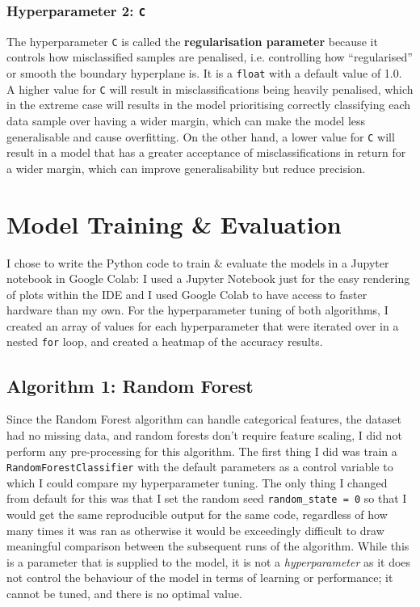 \documentclass[a4paper, 10pt]{article}
\begin{document}
\subsubsection{Hyperparameter 2: \texttt{C}}
The hyperparameter \texttt{C} is called the \textbf{regularisation parameter} because it controls how misclassified samples are penalised, i.e. controlling how ``regularised'' or smooth the boundary hyperplane is.
It is a \texttt{float} with a default value of 1.0.
A higher value for \texttt{C} will result in misclassifications being heavily penalised, which in the extreme case will results in the model prioritising correctly classifying each data sample over having a wider margin, which can make the model less generalisable and cause overfitting.
On the other hand, a lower value for \texttt{C} will result in a model that has a greater acceptance of misclassifications in return for a wider margin, which can improve generalisability but reduce precision.

\section{Model Training \& Evaluation}
I chose to write the Python code to train \& evaluate the models in a Jupyter notebook in Google Colab: I used a Jupyter Notebook just for the easy rendering of plots within the IDE and I used Google Colab to have access to faster hardware than my own.
For the hyperparameter tuning of both algorithms, I created an array of values for each hyperparameter that were iterated over in a nested \texttt{for} loop, and created a heatmap of the accuracy results.

\subsection{Algorithm 1: Random Forest}\label{sec:foresteval}
Since the Random Forest algorithm can handle categorical features, the dataset had no missing data, and random forests don't require feature scaling, I did not perform any pre-processing for this algorithm.
The first thing I did was train a \texttt{RandomForestClassifier} with the default parameters as a control variable to which I could compare my hyperparameter tuning.
The only thing I changed from default for this was that I set the random seed \texttt{random_state = 0} so that I would get the same reproducible output for the same code, regardless of how many times it was ran as otherwise it would be exceedingly difficult to draw meaningful comparison between the subsequent runs of the algorithm.
While this is a parameter that is supplied to the model, it is not a \textit{hyperparameter} as it does not control the behaviour of the model in terms of learning or performance; it cannot be tuned, and there is no optimal value. 
\end{document}
